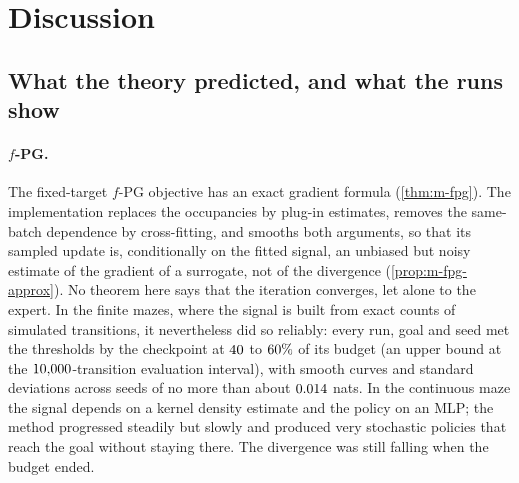 \section{Discussion}\label{sec:discussion}

\subsection{What the theory predicted, and what the runs show}

\paragraph{$f$-PG.}
The fixed-target $f$-PG objective has an exact gradient formula (\cref{thm:m-fpg}). The implementation replaces the occupancies by plug-in estimates, removes the same-batch dependence by cross-fitting, and smooths both arguments, so that its sampled update is, conditionally on the fitted signal, an unbiased but noisy estimate of the gradient of a surrogate, not of the divergence (\cref{prop:m-fpg-approx}).
No theorem here says that the iteration converges, let alone to the expert.
In the finite mazes, where the signal is built from exact counts of simulated transitions, it nevertheless did so reliably: every run, goal and seed met the thresholds by the checkpoint at $\vn{s14.pct.lo}{40}$ to $\vn{s14.pct.hi}{60}\%$ of its budget (an upper bound at the $\vn{fpg.interval.f}{10{,}000}$-transition evaluation interval), with smooth curves and standard deviations across seeds of no more than about $\vn{s11.sd.fpg_max}{0.014}$ nats.
In the continuous maze the signal depends on a kernel density estimate and the policy on an MLP; the method progressed steadily but slowly and produced very stochastic policies that reach the goal without staying there.
The divergence was still falling when the budget ended.

